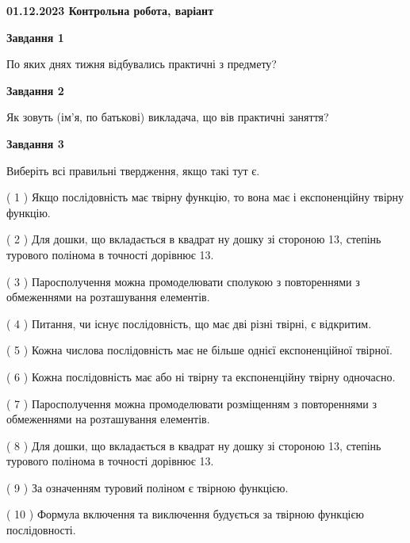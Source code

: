 \documentclass[12pt, ukrainian]{article}
\begin{document}
\begin {large}

\textbf{01.12.2023 Контрольна робота, варіант  }\par


{
{\begin {center}\textbf{Завдання 1}\end {center}}\par
По яких днях тижня відбувались практичні з предмету?\par
{\begin {center}\textbf{Завдання 2}\end {center}}\par
Як зовуть (ім'я, по батькові) викладача, що вів практичні заняття?\par
{\begin {center}\textbf{Завдання 3}\end {center}}\par
Виберіть всі правильні твердження, якщо такі тут є.\par
\vspace{2mm}
( 1 ) Якщо послідовність має твірну функцію, то вона має і експоненційну твірну функцію.%

( 2 ) Для дошки, що вкладається в квадрат ну дошку зі стороною 13, степінь турового полінома в точності дорівнює 13.%

( 3 ) Паросполучення можна промоделювати сполукою з повтореннями з обмеженнями на розташування елементів.%

( 4 ) Питання, чи існує послідовність, що має дві різні твірні, є відкритим.%

( 5 ) Кожна числова послідовність має не більше однієї  експоненційної твірної.%

( 6 ) Кожна послідовність має або ні твірну та експоненційну твірну одночасно.%

( 7 ) Паросполучення можна промоделювати розміщенням з повтореннями з обмеженнями на розташування елементів.%

( 8 ) Для дошки, що вкладається в квадрат ну дошку зі стороною 13, степінь турового полінома в точності дорівнює 13.%

( 9 ) За означенням туровий поліном є твірною функцією.%

( 10 ) Формула включення та виключення будується за твірною функцією послідовності.%
}
\end {large}

\vspace{4mm}
\newpage
\end{document}
